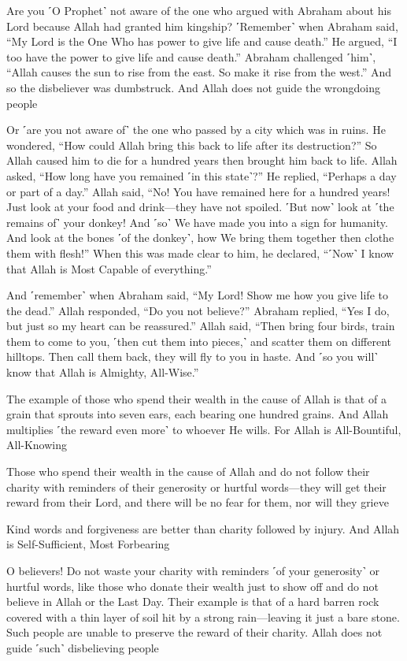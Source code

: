 Are you ˹O Prophet˺ not aware of the one who argued with Abraham about his Lord because Allah had granted him kingship? ˹Remember˺ when Abraham said, “My Lord is the One Who has power to give life and cause death.” He argued, “I too have the power to give life and cause death.” Abraham challenged ˹him˺, “Allah causes the sun to rise from the east. So make it rise from the west.” And so the disbeliever was dumbstruck. And Allah does not guide the wrongdoing people

Or ˹are you not aware of˺ the one who passed by a city which was in ruins. He wondered, “How could Allah bring this back to life after its destruction?” So Allah caused him to die for a hundred years then brought him back to life. Allah asked, “How long have you remained ˹in this state˺?” He replied, “Perhaps a day or part of a day.” Allah said, “No! You have remained here for a hundred years! Just look at your food and drink—they have not spoiled. ˹But now˺ look at ˹the remains of˺ your donkey! And ˹so˺ We have made you into a sign for humanity. And look at the bones ˹of the donkey˺, how We bring them together then clothe them with flesh!” When this was made clear to him, he declared, “˹Now˺ I know that Allah is Most Capable of everything.”

And ˹remember˺ when Abraham said, “My Lord! Show me how you give life to the dead.” Allah responded, “Do you not believe?” Abraham replied, “Yes I do, but just so my heart can be reassured.” Allah said, “Then bring four birds, train them to come to you, ˹then cut them into pieces,˺ and scatter them on different hilltops. Then call them back, they will fly to you in haste. And ˹so you will˺ know that Allah is Almighty, All-Wise.”

The example of those who spend their wealth in the cause of Allah is that of a grain that sprouts into seven ears, each bearing one hundred grains. And Allah multiplies ˹the reward even more˺ to whoever He wills. For Allah is All-Bountiful, All-Knowing

Those who spend their wealth in the cause of Allah and do not follow their charity with reminders of their generosity or hurtful words—they will get their reward from their Lord, and there will be no fear for them, nor will they grieve

Kind words and forgiveness are better than charity followed by injury. And Allah is Self-Sufficient, Most Forbearing

O believers! Do not waste your charity with reminders ˹of your generosity˺ or hurtful words, like those who donate their wealth just to show off and do not believe in Allah or the Last Day. Their example is that of a hard barren rock covered with a thin layer of soil hit by a strong rain—leaving it just a bare stone. Such people are unable to preserve the reward of their charity. Allah does not guide ˹such˺ disbelieving people

